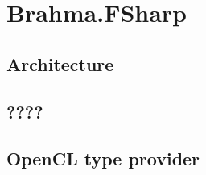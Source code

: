 \section{Brahma.FSharp}
\subsection{Architecture}
\subsection{????}
\subsection{OpenCL type provider}